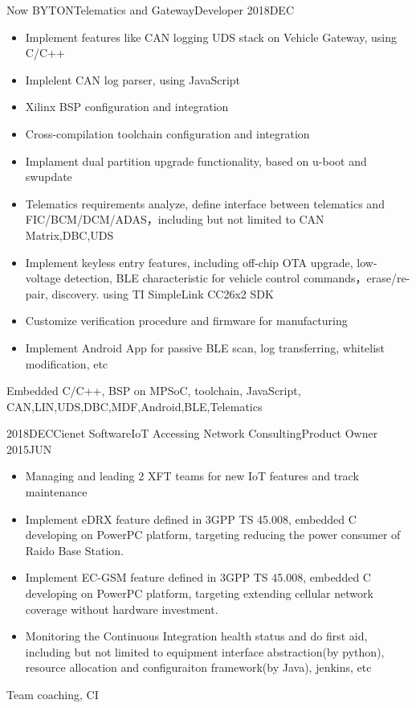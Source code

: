 %
%


 
\begin{experiences}
	
	\experience
	{Now} {BYTON}{Telematics and Gateway}{Developer}
	{2018DEC}    {
		\begin{itemize}
			\item Implement features like CAN logging  UDS stack on Vehicle Gateway, using C/C++
			\item Implelent CAN log parser, using JavaScript
			\item Xilinx BSP configuration and integration
			\item Cross-compilation toolchain configuration and integration
			\item Implament dual partition upgrade functionality, based on u-boot and swupdate
			\item Telematics requirements analyze, define interface between telematics and FIC/BCM/DCM/ADAS，including but not limited to CAN Matrix,DBC,UDS
			\item Implement keyless entry features, including off-chip OTA upgrade, low-voltage detection, BLE characteristic for vehicle control commands，erase/re-pair, discovery. using TI SimpleLink CC26x2 SDK
			\item Customize verification procedure and firmware for manufacturing
			\item Implement Android App for passive BLE scan, log transferring, whitelist modification, etc
		\end{itemize}
	}
	{Embedded C/C++, BSP on MPSoC, toolchain, JavaScript, CAN,LIN,UDS,DBC,MDF,Android,BLE,Telematics}
	
	\emptySeparator	
	\experience
	{2018DEC}{Cienet Software}{IoT Accessing Network Consulting}{Product Owner}
	{2015JUN} {
		\begin{itemize}
            \item Managing and leading 2 XFT teams for new IoT features and track maintenance
			\item Implement eDRX feature defined in 3GPP TS 45.008, embedded C developing on PowerPC platform, targeting reducing the power consumer of Raido Base Station.
			\item Implement EC-GSM feature defined in 3GPP TS 45.008, embedded C developing on PowerPC platform, targeting extending cellular network coverage without hardware investment.
			\item Monitoring the Continuous Integration health status and do first aid, including but not limited to equipment interface abstraction(by python), resource allocation and configuraiton framework(by Java), jenkins, etc
		\end{itemize}
	}
	{Team coaching, CI}
		

\end{experiences}

